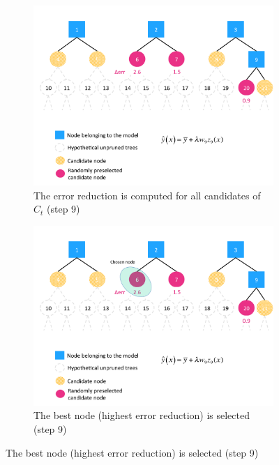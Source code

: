 \documentclass{article}
\begin{document}
\begin{figure}[ht]
  \vspace{4ex}  %
  \begin{subfigure}[b]{0.5\linewidth}
    \centering
    \includegraphics[height=0.25\textheight]{gif_algo3} 
    \caption{The error reduction is computed for all candidates of $C_t$ (step 
    9)} 
    \label{fig:gif-algo3} 
  \end{subfigure} 
  \hspace{\fill}
  \begin{subfigure}[b]{0.5\linewidth}
    \centering
    \includegraphics[height=0.25\textheight]{gif_algo4} 
    \caption{The best node (highest error reduction) is selected (step 9)} 
    \label{fig:gif-algo4} 
  \end{subfigure} 


\end{figure}
\end{document}
